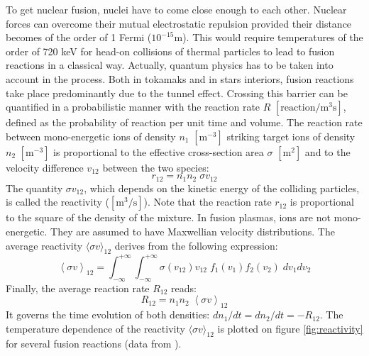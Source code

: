 To get nuclear fusion, nuclei have to come close enough to each other. Nuclear forces can overcome their mutual electrostatic repulsion provided their distance becomes of the order of 1 Fermi ($10^{-15}$m). This would require temperatures of the order of 720 keV for head-on collisions of thermal particles to lead to fusion reactions in a classical way. Actually, quantum physics has to be taken into account in the process. Both in tokamaks and in stars interiors, fusion reactions take place predominantly due to the tunnel effect. Crossing this barrier can be quantified in a probabilistic manner with the reaction rate $R$ $[\mathrm{reaction/m^3 s}]$, defined as the probability of reaction per unit time and volume. The reaction rate between mono-energetic ions of density $n_1$ $\mathrm{[m^{-3}]}$ striking target ions of density $n_2$ $\mathrm{[m^{-3}]}$ is proportional to the effective cross-section area $\sigma$ $\mathrm{[m^2]}$ and to the velocity difference $v_{12}$ between the two species:
\begin{equation}
r_{12} = n_1 n_2 \; \sigma v_{12}
\end{equation}
The quantity  $\sigma v_{12}$, which depends on the kinetic energy of the colliding particles, is called the reactivity ($\mathrm{[m^3/s]}$). Note that the reaction rate $r_{12}$ is proportional to the square of the density of the mixture. In fusion plasmas, ions are not mono-energetic. They are assumed to have Maxwellian velocity distributions. The average reactivity $\langle \sigma v \rangle_{12}$ derives from the following expression:
\begin{equation}
\left < \sigma v \right >_{12} 
= \int_{-\infty}^{+\infty} \int_{-\infty}^{+\infty} 
\sigma(v_{12}) v_{12}\;  f_1(v_1) f_2(v_2) \; dv_1dv_2
\end{equation}
Finally, the average reaction rate $R_{12}$ reads:
\begin{equation}
R_{12} = n_1 n_2 \; \left < \sigma v \right >_{12}
\end{equation}
It governs the time evolution of both densities: $dn_1/dt = dn_2/dt = -R_{12}$.
The temperature dependence of the reactivity $\langle \sigma v \rangle_{12}$ is plotted on figure \ref{fig:reactivity} for several fusion reactions (data from \cite{Huba2013}).

